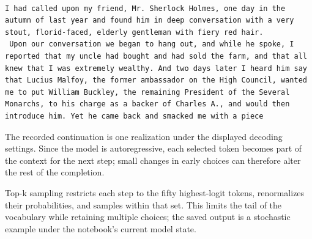 \documentclass[../labs.tex]{subfiles}
\begin{document}
\hypertarget{out:lab03-gpt2-c11}{}\label{out:lab03-gpt2-c11}

\begin{lstlisting}[style=terminalOutput,breakatwhitespace=false,columns=fullflexible]

I had called upon my friend, Mr. Sherlock Holmes, one day in the autumn of last year and found him in deep conversation with a very stout, florid-faced, elderly gentleman with fiery red hair.
 Upon our conversation we began to hang out, and while he spoke, I reported that my uncle had bought and had sold the farm, and that all knew that I was extremely wealthy. And two days later I heard him say that Lucius Malfoy, the former ambassador on the High Council, wanted me to put William Buckley, the remaining President of the Several Monarchs, to his charge as a backer of Charles A., and would then introduce him. Yet he came back and smacked me with a piece

\end{lstlisting}

The recorded continuation is one realization under the displayed decoding settings. Since the model is autoregressive, each selected token becomes part of the context for the next step; small changes in early choices can therefore alter the rest of the completion.


Top-k sampling restricts each step to the fifty highest-logit tokens, renormalizes their probabilities, and samples within that set. This limits the tail of the vocabulary while retaining multiple choices; the saved output is a stochastic example under the notebook’s current model state.

\end{document}
